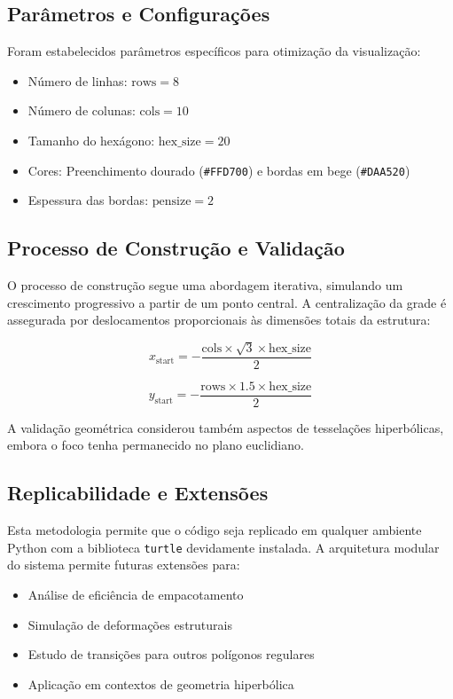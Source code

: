 \documentclass[12pt,a4paper,oneside]{extarticle}
\begin{document}
\subsection{Parâmetros e Configurações}

Foram estabelecidos parâmetros específicos para otimização da visualização:

\begin{itemize}
    \item Número de linhas: $\mathrm{rows} = 8$
    \item Número de colunas: $\mathrm{cols} = 10$  
    \item Tamanho do hexágono: $\mathrm{hex\_size} = 20$
    \item Cores: Preenchimento dourado (\textcolor[HTML]{FFD700}{\texttt{\#FFD700}}) e bordas em bege (\textcolor[HTML]{DAA520}{\texttt{\#DAA520}})
    \item Espessura das bordas: $\mathrm{pensize} = 2$
\end{itemize}

\subsection{Processo de Construção e Validação}

O processo de construção segue uma abordagem iterativa, simulando um crescimento progressivo a partir de um ponto central. A centralização da grade é assegurada por deslocamentos proporcionais às dimensões totais da estrutura:

\begin{equation}
x_{\text{start}} = -\frac{\text{cols} \times \sqrt{3} \times \text{hex\_size}}{2}
\end{equation}

\begin{equation}
y_{\text{start}} = -\frac{\text{rows} \times 1.5 \times \text{hex\_size}}{2}
\end{equation}

A validação geométrica considerou também aspectos de tesselações hiperbólicas, embora o foco tenha permanecido no plano euclidiano.

\subsection{Replicabilidade e Extensões}

Esta metodologia permite que o código seja replicado em qualquer ambiente Python com a biblioteca \texttt{turtle} devidamente instalada. A arquitetura modular do sistema permite futuras extensões para:
\begin{itemize}
    \item Análise de eficiência de empacotamento
    \item Simulação de deformações estruturais
    \item Estudo de transições para outros polígonos regulares
    \item Aplicação em contextos de geometria hiperbólica
\end{itemize}
\end{document}
